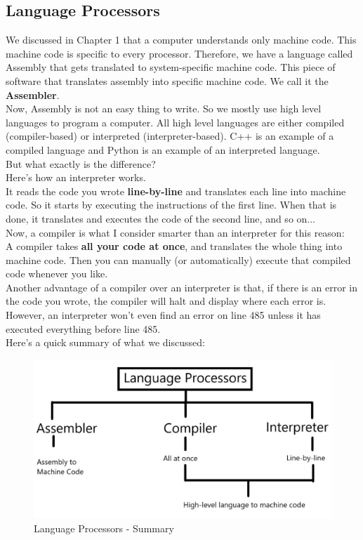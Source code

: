 \documentclass[letterpaper, 12pt]{book}
\begin{document}
\subsection{Language Processors}
We discussed in Chapter 1 that a computer understands only machine code. This machine code is specific to every processor. Therefore, we have a language called Assembly that gets translated to system-specific machine code. This piece of software that translates assembly into specific machine code. We call it the \textbf{Assembler}.\\
Now, Assembly is not an easy thing to write. So we mostly use high level languages to program a computer. All high level languages are either compiled (compiler-based) or interpreted (interpreter-based). C++ is an example of a compiled language and Python is an example of an interpreted language.\\
But what exactly is the difference?\\
Here's how an interpreter works.\\
It reads the code you wrote \textbf{line-by-line} and translates each line into machine code. So it starts by executing the instructions of the first line. When that is done, it translates and executes the code of the second line, and so on...\\
Now, a compiler is what I consider smarter than an interpreter for this reason:\\
A compiler takes \textbf{all your code at once}, and translates the whole thing into machine code. Then you can manually (or automatically) execute that compiled code whenever you like.\\
Another advantage of a compiler over an interpreter is that, if there is an error in the code you wrote, the compiler will halt and display where each error is. However, an interpreter won't even find an error on line 485 unless it has executed everything before line 485.\\
Here's a quick summary of what we discussed:\\
\begin{figure}[h]
\centering
\includegraphics[scale=0.6]{img/lang_proc}
\caption{Language Processors - Summary}\label{lang_proc}
\end{figure}
\end{document}
